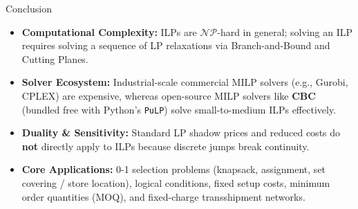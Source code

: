 \documentclass[aspectratio=169]{beamer}
\begin{document}
\begin{frame}{Conclusion}
\begin{itemize}
\item \textbf{Computational Complexity:} ILPs are $\mathcal{NP}$-hard in general; solving an ILP requires solving a sequence of LP relaxations via Branch-and-Bound and Cutting Planes.
\item \textbf{Solver Ecosystem:} Industrial-scale commercial MILP solvers (e.g., Gurobi, CPLEX) are expensive, whereas open-source MILP solvers like \textbf{CBC} (bundled free with Python's \texttt{PuLP}) solve small-to-medium ILPs effectively.
\item \textbf{Duality \& Sensitivity:} Standard LP shadow prices and reduced costs do \textbf{not} directly apply to ILPs because discrete jumps break continuity.
\item \textbf{Core Applications:} 0-1 selection problems (knapsack, assignment, set covering / store location), logical conditions, fixed setup costs, minimum order quantities (MOQ), and fixed-charge transshipment networks.
\end{itemize}
\end{frame}
\end{document}
